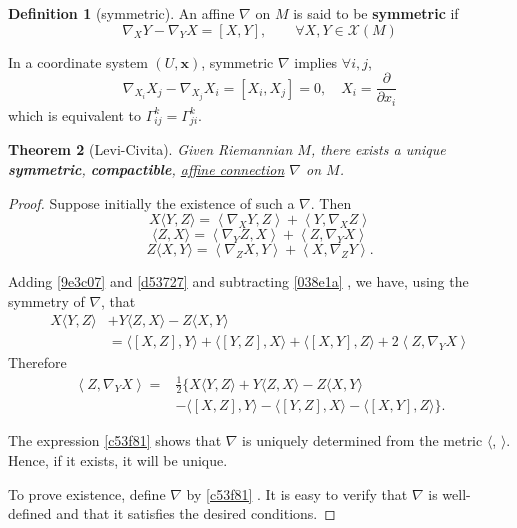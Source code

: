 \documentclass{amsart}
\theoremstyle{plain}
\newtheorem{theorem}{Theorem}[section]
\theoremstyle{definition}
\newtheorem{definition}[theorem]{Definition}
\theoremstyle{remark}
\begin{document}
\begin{definition}[symmetric]
An affine $\nabla$ on $M$ is said to be \textbf{symmetric} if
\[
\nabla_{X}Y-\nabla_{Y}X=[X,Y],\qquad \forall X,Y\in \mathcal{X}(M)
\]
\end{definition}
In a coordinate system $(U,\mathbf{x})$, symmetric $\nabla$ implies $\forall i,j$,
\[
\nabla_{X_i}X_j-\nabla_{X_j}X_i=[X_i,X_j]=0,\quad X_i=\frac{ \partial   }{ \partial x_i }
\]
which is equivalent to $\Gamma^{k}_{ij}=\Gamma^{k}_{ji}$.

\begin{theorem}[Levi-Civita]
Given Riemannian $M$, there exists a unique \textbf{symmetric}, \textbf{compactible}, \underline{affine connection} $\nabla$ on $M$.
\end{theorem}
\begin{proof}

Suppose initially the existence of such a $\nabla$. Then
\begin{equation}
X\langle Y, Z\rangle=\left\langle\nabla_X Y, Z\right\rangle+\left\langle Y, \nabla_X Z\right\rangle
\label{9e3c07}
\end{equation}
\begin{equation}
\langle Z, X\rangle=\left\langle\nabla_Y Z, X\right\rangle+\left\langle Z, \nabla_Y X\right\rangle
\label{d53727}
\end{equation}
\begin{equation}
Z\langle X, Y\rangle=\left\langle\nabla_Z X, Y\right\rangle+\left\langle X, \nabla_Z Y\right\rangle .
\label{038e1a}
\end{equation}

Adding \cref{9e3c07}  and \cref{d53727}  and subtracting \cref{038e1a} , we have, using the symmetry of $\nabla$, that
\[
\begin{aligned}
X\langle Y, Z\rangle & +Y\langle Z, X\rangle-Z\langle X, Y\rangle \\
& =\langle[X, Z], Y\rangle+\langle[Y, Z], X\rangle+\langle[X, Y], Z\rangle+2\left\langle Z, \nabla_Y X\right\rangle
\end{aligned}
\]
Therefore
\begin{equation}
\begin{aligned}
\left\langle Z, \nabla_Y X\right\rangle= & \frac{1}{2}\{X\langle Y, Z\rangle+Y\langle Z, X\rangle-Z\langle X, Y\rangle \\
& -\langle[X, Z], Y\rangle-\langle[Y, Z], X\rangle-\langle[X, Y], Z\rangle\} .
\end{aligned}
\label{c53f81}
\end{equation}

The expression \cref{c53f81}  shows that $\nabla$ is uniquely determined from the metric $\langle$, $\rangle$. Hence, if it exists, it will be unique.

To prove existence, define $\nabla$ by \cref{c53f81} . It is easy to verify that $\nabla$ is well-defined and that it satisfies the desired conditions.

\end{proof}
\end{document}
